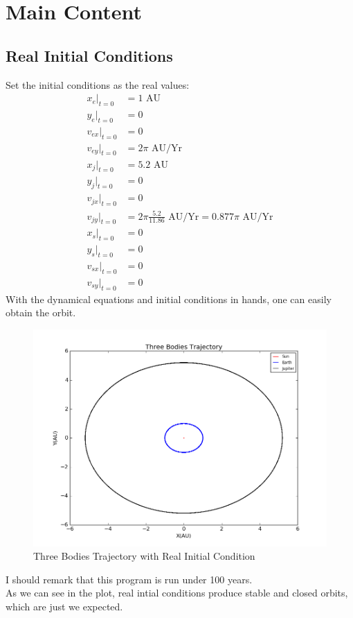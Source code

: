 \documentclass[10pt,a4paper]{article}
\begin{document}
    \section{Main Content}
    \subsection{Real Initial Conditions}
    Set the initial conditions as the real values:
    \begin{align}
    x_e|_{t=0}&=1\text{ AU}\\
    y_e|_{t=0}&=0\\
    v_{ex}|_{t=0}&=0\\
    v_{ey}|_{t=0}&=2\pi\text{ AU/Yr}\\
    x_j|_{t=0}&=5.2\text{ AU}\\
    y_j|_{t=0}&=0\\
    v_{jx}|_{t=0}&=0\\
    v_{jy}|_{t=0}&=2\pi\frac{5.2}{11.86}\text{ AU/Yr}=0.877\pi\text{ AU/Yr}\\
    x_s|_{t=0}&=0\\
    y_s|_{t=0}&=0\\
    v_{sx}|_{t=0}&=0\\
    v_{sy}|_{t=0}&=0
    \end{align}
    With the dynamical equations and initial conditions in hands, one can easily obtain the orbit.\\
    \begin{figure}[htbp]
    	\centering
    	\includegraphics[width=5in]{threebodies_1.png}
    	\caption{Three Bodies Trajectory with Real Initial Condition}
    \end{figure}
    I should remark that this program is run under 100 years.\\
    As we can see in the plot, real intial conditions produce stable and closed orbits, which are just we expected.
\end{document}
